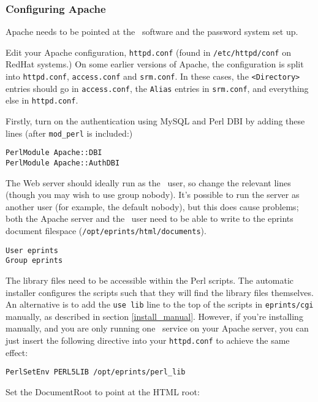 \subsubsection{Configuring Apache}
\label{manual_apache}

Apache needs to be pointed at the \eprints\ software and the password system set up.

Edit your Apache configuration, {\tt httpd.conf} (found in {\tt /etc/httpd/conf} on RedHat systems.) On some earlier versions of Apache, the configuration is split into {\tt httpd.conf}, {\tt access.conf} and {\tt srm.conf}.  In these cases, the {\tt <Directory>} entries should go in {\tt access.conf}, the {\tt Alias} entries in {\tt srm.conf}, and everything else in {\tt httpd.conf}.

Firstly, turn on the authentication using MySQL and Perl DBI by adding these lines (after {\tt mod\_perl} is included:)

\begin{verbatim}
PerlModule Apache::DBI
PerlModule Apache::AuthDBI
\end{verbatim}

The Web server should ideally run as the \eprints\ user, so change the relevant lines (though you may wish to use group nobody). It's possible to run the server as another user (for example, the default nobody), but this does cause problems; both the Apache server and the \eprints\ user need to be able to write to the eprints document filespace ({\tt /opt/eprints/html/documents}).

\begin{verbatim}
User eprints
Group eprints
\end{verbatim}

The library files need to be accessible within the Perl scripts. The automatic installer configures the scripts such that they will find the library files themselves. An alternative is to add the {\tt use lib} line to the top of the scripts in {\tt eprints/cgi} manually, as described in section \ref{install_manual}. However, if you're installing manually, and you are only running one \eprints\ service on your Apache server, you can just insert the following directive into your {\tt httpd.conf} to achieve the same effect:

\begin{verbatim}
PerlSetEnv PERL5LIB /opt/eprints/perl_lib
\end{verbatim}

Set the DocumentRoot to point at the HTML root:

